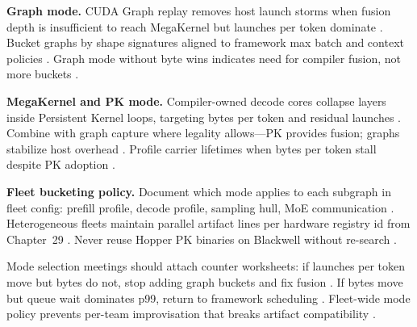 \textbf{Graph mode.} CUDA Graph replay removes host launch storms when fusion depth is insufficient to reach MegaKernel but launches per token dominate \citep{memoryfloor2026,nvidia2024cudagraphs,patel2025llminference,yirage2026,chen2020compilerbasedhardw,dlbook}. Bucket graphs by shape signatures aligned to framework max batch and context policies \citep{kwon2023vllm,nvidia2024cudagraphs,yirage2026,chen2020compilerbasedhardw,patel2025llminference,memoryfloor2026,dlbook}. Graph mode without byte wins indicates need for compiler fusion, not more buckets \citep{memoryfloor2026,taxbreak2026,yirage2026,chen2020compilerbasedhardw,patel2025llminference,dlbook}.

\textbf{MegaKernel and PK mode.} Compiler-owned decode cores collapse layers inside Persistent Kernel loops, targeting bytes per token and residual launches \citep{yirage2026,chen2020compilerbasedhardw,taxbreak2026,memoryfloor2026,patel2025llminference,dao2022flashattention,dlbook}. Combine with graph capture where legality allows---PK provides fusion; graphs stabilize host overhead \citep{yirage2026,nvidia2024cudagraphs,chen2020compilerbasedhardw,patel2025llminference,memoryfloor2026,taxbreak2026,dlbook}. Profile carrier lifetimes when bytes per token stall despite PK adoption \citep{memoryfloor2026,yirage2026,chen2020compilerbasedhardw,patel2025llminference,dao2022flashattention,dlbook}.

\textbf{Fleet bucketing policy.} Document which mode applies to each subgraph in fleet config: prefill profile, decode profile, sampling hull, MoE communication \citep{patel2025llminference,yirage2026,chen2020compilerbasedhardw,kwon2023vllm,liu2024deepseekv3,nvidia2024cudagraphs,dlbook}. Heterogeneous fleets maintain parallel artifact lines per hardware registry id from Chapter~29 \citep{yirage2026,chen2020compilerbasedhardw,patel2025llminference,amd2024xdna,amd2024aie,semianalysis2024tma,dlbook}. Never reuse Hopper PK binaries on Blackwell without re-search \citep{yirage2026,chen2020compilerbasedhardw,nvidia2022hopper,semianalysis2024tma,patel2025llminference,dlbook,taxbreak2026,memoryfloor2026,kwon2023vllm,liu2024deepseekv3,nvidia2024cudagraphs,dao2022flashattention,amd2024aie,amd2024xdna,dao2023flashdecoding,dlbook}.

Mode selection meetings should attach counter worksheets: if launches per token move but bytes do not, stop adding graph buckets and fix fusion \citep{taxbreak2026,memoryfloor2026,patel2025llminference,yirage2026,chen2020compilerbasedhardw,dlbook}. If bytes move but queue wait dominates p99, return to framework scheduling \citep{patel2025llminference,kwon2023vllm,memoryfloor2026,yirage2026,chen2020compilerbasedhardw,dlbook}. Fleet-wide mode policy prevents per-team improvisation that breaks artifact compatibility \citep{yirage2026,chen2020compilerbasedhardw,patel2025llminference,kwon2023vllm,dlbook}.

